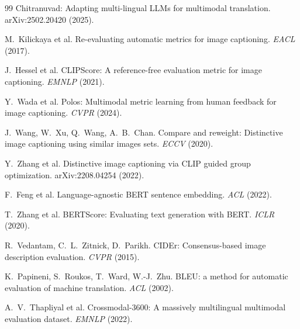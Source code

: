 \documentclass[11pt]{article}
\begin{document}
\begin{thebibliography}{99}
 Chitranuvad: Adapting multi-lingual LLMs for
multimodal translation. arXiv:2502.20420 (2025).

 M.~Kilickaya et al. Re-evaluating automatic
metrics for image captioning. \emph{EACL} (2017).

 J.~Hessel et al. CLIPScore: A reference-free
evaluation metric for image captioning. \emph{EMNLP} (2021).

 Y.~Wada et al. Polos: Multimodal metric learning
from human feedback for image captioning. \emph{CVPR} (2024).

 J.~Wang, W.~Xu, Q.~Wang, A.~B.~Chan. Compare
and reweight: Distinctive image captioning using similar images sets.
\emph{ECCV} (2020).

 Y.~Zhang et al. Distinctive image captioning via
CLIP guided group optimization. arXiv:2208.04254 (2022).

 F.~Feng et al. Language-agnostic BERT sentence
embedding. \emph{ACL} (2022).

 T.~Zhang et al. BERTScore: Evaluating text
generation with BERT. \emph{ICLR} (2020).

 R.~Vedantam, C.~L.~Zitnick, D.~Parikh. CIDEr:
Consensus-based image description evaluation. \emph{CVPR} (2015).

 K.~Papineni, S.~Roukos, T.~Ward, W.-J.~Zhu. BLEU: a
method for automatic evaluation of machine translation. \emph{ACL}
(2002).

 A.~V.~Thapliyal et al. Crossmodal-3600: A massively
multilingual multimodal evaluation dataset. \emph{EMNLP} (2022).

\end{thebibliography}
\end{document}
